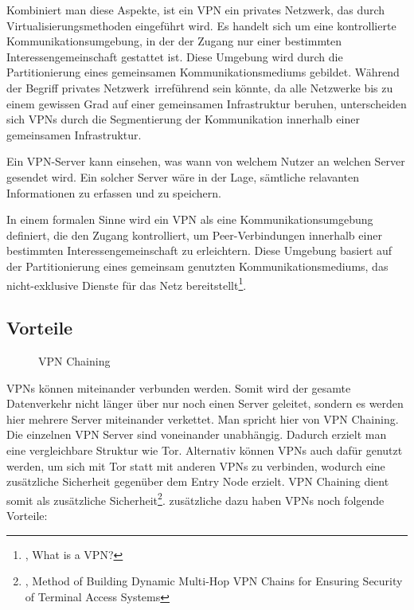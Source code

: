 Kombiniert man diese Aspekte, ist ein VPN ein privates Netzwerk, das durch Virtualisierungsmethoden eingeführt wird. Es handelt sich um eine kontrollierte Kommunikationsumgebung, in der der Zugang nur einer bestimmten Interessengemeinschaft gestattet ist. Diese Umgebung wird durch die Partitionierung eines gemeinsamen Kommunikationsmediums gebildet. Während der Begriff \glqq privates Netzwerk\grqq\ irreführend sein könnte, da alle Netzwerke bis zu einem gewissen Grad auf einer gemeinsamen Infrastruktur beruhen, unterscheiden sich VPNs durch die Segmentierung der Kommunikation innerhalb einer gemeinsamen Infrastruktur.

Ein VPN-Server kann einsehen, was wann von welchem Nutzer an welchen Server gesendet wird. Ein solcher Server wäre in der Lage, sämtliche relavanten Informationen zu erfassen und zu speichern.

In einem formalen Sinne wird ein VPN als eine Kommunikationsumgebung definiert, die den Zugang kontrolliert, um Peer-Verbindungen innerhalb einer bestimmten Interessengemeinschaft zu erleichtern. Diese Umgebung basiert auf der Partitionierung eines gemeinsam genutzten Kommunikationsmediums, das nicht-exklusive Dienste für das Netz bereitstellt\footnote{\cite{DefinitionOfVPN}, What is a VPN?}.

\subsection{Vorteile}
\label{chap:vpn_advantages}

\begin{figure}[h!]
    \centering
    
    \caption{VPN Chaining}
    \label{imgs:vpn_chaining}
\end{figure}

VPNs können miteinander verbunden werden. Somit wird der gesamte Datenverkehr nicht länger über nur noch einen Server geleitet, sondern es werden hier mehrere Server miteinander verkettet. Man spricht hier von VPN Chaining. Die einzelnen VPN Server sind voneinander unabhängig. Dadurch erzielt man eine vergleichbare Struktur wie Tor. Alternativ können VPNs auch dafür genutzt werden, um sich mit Tor statt mit anderen VPNs zu verbinden, wodurch eine zusätzliche Sicherheit gegenüber dem Entry Node erzielt. VPN Chaining dient somit als zusätzliche Sicherheit\footnote{\cite{VPNChains}, Method of Building Dynamic Multi-Hop VPN Chains for Ensuring Security of Terminal Access Systems}.
zusätzliche dazu haben VPNs noch folgende Vorteile:

